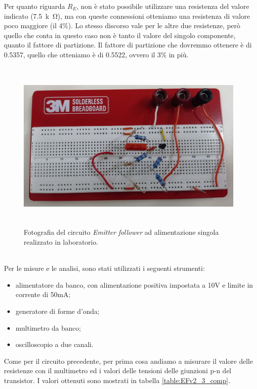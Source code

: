 \documentclass{report}
\begin{document}
Per quanto riguarda $R_E$, non è stato possibile utilizzare una resistenza del valore indicato (\SI{7.5}{k\ohm}), ma con queste connessioni otteniamo una resistenza di valore poco maggiore (il 4\%). Lo stesso discorso vale per le altre due resistenze, però quello che conta in questo caso non è tanto il valore del singolo componente, quanto il fattore di partizione. Il fattore di partizione che dovremmo ottenere è di 0.5357, quello che otteniamo è di 0.5522, ovvero il 3\% in più.
\begin{figure}[h]
\centering
\includegraphics[height=8.5cm]{immagini/fotoEFv2_3}
\caption{Fotografia del circuito \textit{Emitter follower} ad alimentazione singola realizzato in laboratorio.}
\label{figura:fotoEFv2_3}
\end{figure}
\\Per le misure e le analisi, sono stati utilizzati i seguenti strumenti:
\begin{itemize}
\item alimentatore da banco, con alimentazione positiva impostata a 10V e limite in corrente di 50mA;
\item generatore di forme d'onda;
\item multimetro da banco;
\item oscilloscopio a due canali.
\end{itemize}
Come per il circuito precedente, per prima cosa andiamo a misurare il valore delle resistenze con il multimetro ed i valori delle tensioni delle giunzioni p-n del transistor. I valori ottenuti sono mostrati in tabella \ref{table:EFv2_3_comp}.
\\
\end{document}
